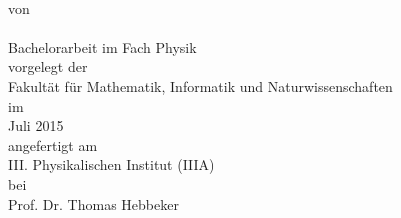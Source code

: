\makeatletter
\begin{titlepage}
		\tgherosfont
		\centering
		
		\vspace*{\fill}
		
		{\Huge \color{ctcolormain}\textbf{\@title}} \\[8mm]
		
		\textsf{von} \\
		{\LARGE \@author} \\[48mm]
		
		\Large{Bachelorarbeit im Fach Physik} \\[16mm]
		
		\textsf{vorgelegt der} \\
		\Large{Fakultät für Mathematik, Informatik und Naturwissenschaften} \\[8mm]
		
		\textsf{im} \\
		\Large{Juli 2015} \\[8mm]
		
		\textsf{angefertigt am} \\
		\Large{III. Physikalischen Institut (IIIA)} \\[8mm]
		
		\textsf{bei} \\
		\Large{Prof. Dr. Thomas Hebbeker} \\
\end{titlepage}
\makeatother